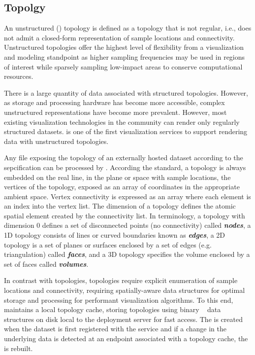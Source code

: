 \subsection{\ugrid{} Topolgy}
An unstructured (\ugrid{}) topology is defined as a topology that is
not regular, i.e., does not admit a closed-form representation of
sample locations and connectivity. Unstructured topologies offer the
highest level of flexibility from a visualization and modeling
standpoint as higher sampling frequencies may be used in regions of
interest while sparsely sampling low-impact areas to conserve
computational resources. 

There is a large quantity of \cf{} data associated with structured
topologies. However, as storage and processing hardware has become
more accessible, complex unstructured representations have become more
prevalent. However, most existing visualization technologies in the
\cf{} community can render only regularly structured
datasets. \sciwms{} is one of the first visualization services to
support rendering data with unstructured topologies.

Any \ncml{} file exposing the topology of an externally hosted dataset
according to the \cfugrid{} sepcification can be processed by
\sciwms{}. According the \cfugrid{} standard, a topology is always
embedded on the real line, in the plane or space with sample
locations, the vertices of the topology, exposed as an array of
coordinates in the appropriate ambient space. Vertex connectivity is
expressed as an array where each element is an index into the vertex
list. The dimension of a topology defines the atomic spatial element
created by the connectivity list. In \cfugrid{} terminology, a
topology with dimension 0 defines a set of disconnected points (no
connectivity) called \textbf{\textit{nodes}}, a 1D topology consists
of lines or curved boundaries known as \textbf{\textit{edges}}, a 2D
topology is a set of planes or surfaces enclosed by a set of edges
(e.g. triangulation) called \textbf{\textit{faces}}, and a 3D topology
specifies the volume enclosed by a set of faces called
\textbf{\textit{volumes}}.

In contrast with \cgrid{} topologies, \ugrid{} topologies require
explicit enumeration of sample locations and connectivity, requiring
spatially-aware data structures for optimal storage and processing for
performant visualization algorithms. To this end, \sciwms{} maintains
a local topology cache, storing \ugrid{} topologies using binary
\rtree{}~\cite{Guttman84} data structures on disk local to the
deployment server for fast access. The \rtree{} is created when the
dataset is first registered with the \sciwms{} service and if a change in
the underlying data is detected at an endpoint associated with a
topology cache, the \rtree{} is rebuilt.
